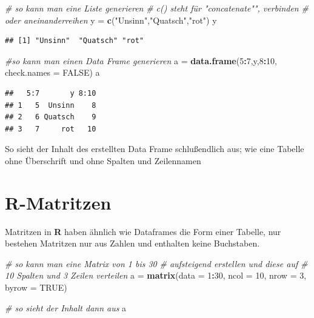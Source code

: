 \documentclass[]{book}
\newenvironment{Shaded}{\begin{snugshade}}{\end{snugshade}}
\newcommand{\KeywordTok}[1]{\textcolor[rgb]{0.13,0.29,0.53}{\textbf{#1}}}
\newcommand{\DataTypeTok}[1]{\textcolor[rgb]{0.13,0.29,0.53}{#1}}
\newcommand{\DecValTok}[1]{\textcolor[rgb]{0.00,0.00,0.81}{#1}}
\newcommand{\StringTok}[1]{\textcolor[rgb]{0.31,0.60,0.02}{#1}}
\newcommand{\CommentTok}[1]{\textcolor[rgb]{0.56,0.35,0.01}{\textit{#1}}}
\newcommand{\OtherTok}[1]{\textcolor[rgb]{0.56,0.35,0.01}{#1}}
\newcommand{\OperatorTok}[1]{\textcolor[rgb]{0.81,0.36,0.00}{\textbf{#1}}}
\newcommand{\NormalTok}[1]{#1}
\begin{document}
\begin{Shaded}
\begin{Highlighting}[]
\CommentTok{# so kann man eine Liste generieren}
\CommentTok{# c() steht für "concatenate"", verbinden }
\CommentTok{# oder aneinanderreihen }
\NormalTok{y =}\StringTok{ }\KeywordTok{c}\NormalTok{(}\StringTok{"Unsinn"}\NormalTok{,}\StringTok{"Quatsch"}\NormalTok{,}\StringTok{"rot"}\NormalTok{)}
\NormalTok{y}
\end{Highlighting}
\end{Shaded}

\begin{verbatim}
## [1] "Unsinn"  "Quatsch" "rot"
\end{verbatim}

\begin{Shaded}
\begin{Highlighting}[]
\CommentTok{#so kann man einen Data Frame generieren }
\NormalTok{a =}\StringTok{ }\KeywordTok{data.frame}\NormalTok{(}\DecValTok{5}\OperatorTok{:}\DecValTok{7}\NormalTok{,y,}\DecValTok{8}\OperatorTok{:}\DecValTok{10}\NormalTok{, }\DataTypeTok{check.names =} \OtherTok{FALSE}\NormalTok{)}
\NormalTok{a}
\end{Highlighting}
\end{Shaded}

\begin{verbatim}
##   5:7       y 8:10
## 1   5  Unsinn    8
## 2   6 Quatsch    9
## 3   7     rot   10
\end{verbatim}

So sieht der Inhalt des erstellten Data Frame schlußendlich aus; wie
eine Tabelle ohne Überschrift und ohne Spalten und Zeilennamen

\section{R-Matritzen}\label{r-matritzen}

Matritzen in \textbf{R} haben ähnlich wie Dataframes die Form einer
Tabelle, nur bestehen Matritzen nur aus Zahlen und enthalten keine
Buchstaben.

\begin{Shaded}
\begin{Highlighting}[]
\CommentTok{# so kann man eine Matrix von 1 bis 30 }
\CommentTok{# aufsteigend erstellen und diese auf }
\CommentTok{# 10 Spalten und 3 Zeilen verteilen}
\NormalTok{a =}\StringTok{ }\KeywordTok{matrix}\NormalTok{(}\DataTypeTok{data =} \DecValTok{1}\OperatorTok{:}\DecValTok{30}\NormalTok{, }\DataTypeTok{ncol =} \DecValTok{10}\NormalTok{, }\DataTypeTok{nrow =} \DecValTok{3}\NormalTok{, }\DataTypeTok{byrow =} \OtherTok{TRUE}\NormalTok{)}

\CommentTok{# so sieht der Inhalt dann aus}
\NormalTok{a}
\end{Highlighting}
\end{Shaded}
\end{document}
